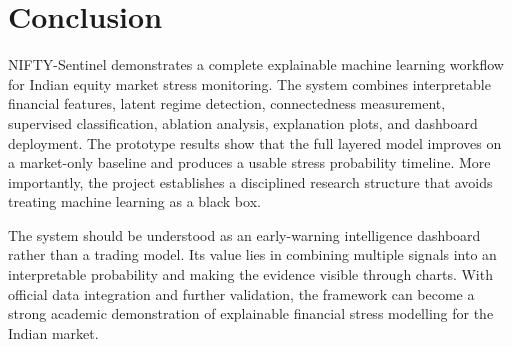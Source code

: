 \documentclass[12pt,a4paper]{article}
\begin{document}
\section{Conclusion}

NIFTY-Sentinel demonstrates a complete explainable machine learning workflow for Indian equity market stress monitoring. The system combines interpretable financial features, latent regime detection, connectedness measurement, supervised classification, ablation analysis, explanation plots, and dashboard deployment. The prototype results show that the full layered model improves on a market-only baseline and produces a usable stress probability timeline. More importantly, the project establishes a disciplined research structure that avoids treating machine learning as a black box.

The system should be understood as an early-warning intelligence dashboard rather than a trading model. Its value lies in combining multiple signals into an interpretable probability and making the evidence visible through charts. With official data integration and further validation, the framework can become a strong academic demonstration of explainable financial stress modelling for the Indian market.
\end{document}
